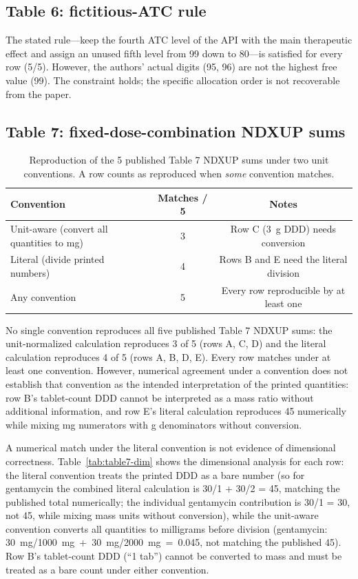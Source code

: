\documentclass[twocolumn,a4paper]{elsarticle}
\begin{document}
\subsection{Table 6: fictitious-ATC rule}
\label{sec:results-table6}

The stated rule---keep the fourth ATC level of the API with the main therapeutic effect and assign an unused fifth level from 99 down to 80---is satisfied for every row (5/5). However, the authors' actual digits (95, 96) are not the highest free value (99). The constraint holds; the specific allocation order is not recoverable from the paper.

\subsection{Table 7: fixed-dose-combination NDXUP sums}
\label{sec:results-table7}

\begin{table}[htbp]
\centering\small
\caption{Reproduction of the 5 published Table 7 NDXUP sums under two unit conventions. A row counts as reproduced when \emph{some} convention matches.}
\label{tab:table7}
\begin{tabular}{@{}p{3.0cm}cc@{}}
\toprule
Convention & Matches / 5 & Notes \\
\midrule
Unit-aware (convert all quantities to mg) & 3 & Row C (3~g DDD) needs conversion \\
Literal (divide printed numbers) & 4 & Rows B and E need the literal division \\
Any convention & 5 & Every row reproducible by at least one \\
\bottomrule
\end{tabular}
\end{table}

No single convention reproduces all five published Table 7 NDXUP sums: the unit-normalized calculation reproduces 3 of 5 (rows A, C, D) and the literal calculation reproduces 4 of 5 (rows A, B, D, E). Every row matches under at least one convention. However, numerical agreement under a convention does not establish that convention as the intended interpretation of the printed quantities: row B's tablet-count DDD cannot be interpreted as a mass ratio without additional information, and row E's literal calculation reproduces 45 numerically while mixing mg numerators with g denominators without conversion.

A numerical match under the literal convention is not evidence of dimensional correctness. Table~\ref{tab:table7-dim} shows the dimensional analysis for each row: the literal convention treats the printed DDD as a bare number (so for gentamycin the combined literal calculation is 30/1 + 30/2 = 45, matching the published total numerically; the individual gentamycin contribution is 30/1 = 30, not 45, while mixing mass units without conversion), while the unit-aware convention converts all quantities to milligrams before division (gentamycin: 30~mg/1000~mg~+~30~mg/2000~mg~=~0.045, not matching the published 45). Row B's tablet-count DDD (``1 tab'') cannot be converted to mass and must be treated as a bare count under either convention.
\end{document}
